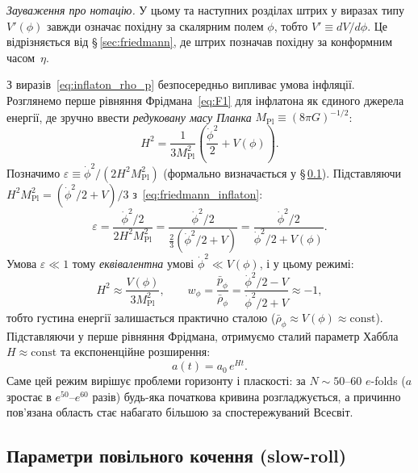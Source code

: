 \documentclass[12pt, a4paper]{article}
\begin{document}
\noindent
\textit{Зауваження про нотацію.} У цьому та наступних розділах
штрих у виразах типу $V'(\phi)$ завжди означає похідну за
скалярним полем $\phi$, тобто $V' \equiv dV/d\phi$. Це відрізняється
від §\,\ref{sec:friedmann}, де штрих позначав похідну за конформним
часом~$\eta$.

З виразів~\eqref{eq:inflaton_rho_p} безпосередньо випливає умова
інфляції. Розглянемо перше рівняння Фрідмана~\eqref{eq:F1} для
інфлатона як єдиного джерела енергії, де зручно ввести
\emph{редуковану масу Планка} $M_\mathrm{Pl} \equiv (8\pi G)^{-1/2}$:
\begin{equation}\label{eq:friedmann_inflaton}
  H^2 = \frac{1}{3M_\mathrm{Pl}^2}
        \left(\frac{\dot\phi^2}{2} + V(\phi)\right).
\end{equation}
Позначимо $\varepsilon \equiv \dot\phi^2/(2H^2 M_\mathrm{Pl}^2)$
(формально визначається у §\,\ref{subsec:slowroll}).
Підставляючи $H^2 M_\mathrm{Pl}^2 = (\dot\phi^2/2 + V)/3$
з~\eqref{eq:friedmann_inflaton}:
\begin{equation*}
  \varepsilon
    = \frac{\dot\phi^2/2}{2H^2 M_\mathrm{Pl}^2}
    = \frac{\dot\phi^2/2}{\tfrac{2}{3}(\dot\phi^2/2 + V)}
    = \frac{\dot\phi^2/2}{\dot\phi^2/2 + V(\phi)}.
\end{equation*}
Умова $\varepsilon \ll 1$ тому \emph{еквівалентна} умові
$\dot\phi^2 \ll V(\phi)$, і у цьому режимі:
\begin{equation*}
  H^2 \approx \frac{V(\phi)}{3M_\mathrm{Pl}^2}, \qquad
  w_\phi = \frac{\bar{p}_\phi}{\bar{\rho}_\phi}
         = \frac{\dot\phi^2/2 - V}{\dot\phi^2/2 + V} \approx -1,
\end{equation*}
тобто густина енергії залишається практично сталою
($\bar{\rho}_\phi \approx V(\phi) \approx \mathrm{const}$).
Підставляючи у перше рівняння Фрідмана, отримуємо
сталий параметр Хаббла $H \approx \mathrm{const}$ та
експоненційне розширення:
\begin{equation*}
  a(t) = a_0\,e^{Ht}.
\end{equation*}
Саме цей режим вирішує проблеми горизонту і пласкості: за $N \sim
50$--$60$ $e$-folds ($a$ зростає в $e^{50}$--$e^{60}$ разів)
будь-яка початкова кривина розгладжується, а причинно пов'язана
область стає набагато більшою за спостережуваний Всесвіт.

\subsection{Параметри повільного кочення (slow-roll)}
\label{subsec:slowroll}
\end{document}
